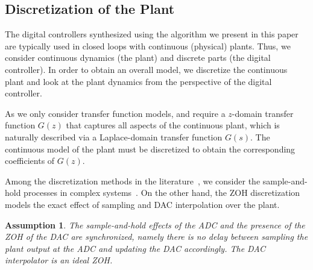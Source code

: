 \documentclass[final]{sig-alternate-05-2015}
\newcommand{\red}[1]{{\color{red}#1}}
\newtheorem{myassumption}{Assumption}
\begin{document}
\subsection{Discretization of the Plant}
\label{ssec:SandH}

The digital controllers synthesized using the algorithm we present in this
paper are typically used in closed loops with continuous (physical) plants. 
Thus, we consider continuous dynamics (the plant) and discrete parts (the
digital controller). In order to obtain an overall model, we discretize the
continuous plant and look at the plant dynamics from the perspective of the digital controller. 

As we only consider transfer function models, and require a $z$-domain transfer
function $G(z)$ that captures all aspects of the continuous plant, 
which is naturally described via a Laplace-domain transfer function $G(s)$. 
The continuous model of the plant must be discretized to obtain the
corresponding coefficients of $G(z)$.


Among the discretization methods in the literature~\cite{Franklin15}, 
we consider the sample-and-hold processes in complex systems~\cite{istepanian2012digital}.  
On the other hand, 
the ZOH discretization models the exact effect of sampling and DAC interpolation over the plant.

\begin{myassumption}
%
The sample-and-hold effects of the ADC and the presence of the ZOH of the DAC are synchronized,
namely there is no delay between sampling the plant output at the ADC and
updating the DAC accordingly.  The DAC interpolator is an ideal ZOH. 
%
\end{myassumption}
\end{document}

